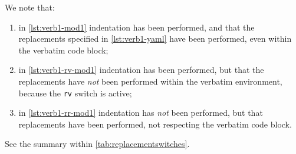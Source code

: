     We note that:
    \begin{enumerate}
      \item in \cref{lst:verb1-mod1} indentation has been performed, and that the replacements specified in \cref{lst:verb1-yaml}
        have been performed, even within the verbatim code block;
      \item in \cref{lst:verb1-rv-mod1} indentation has been performed, but that the replacements have \emph{not} been performed 
        within the verbatim environment, because the \texttt{rv} switch is active;
      \item in \cref{lst:verb1-rr-mod1}  indentation has \emph{not} been performed, but that replacements have been performed, 
        not respecting the verbatim code block.
    \end{enumerate}
    See the summary within \vref{tab:replacementswitches}.
